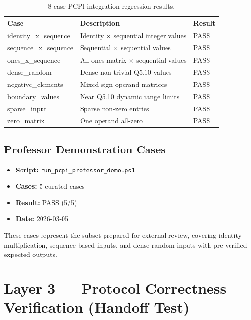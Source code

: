 ﻿\documentclass[12pt,a4paper]{report}
\renewcommand{\arraystretch}{1.2}
\begin{document}
\begin{table}[H]
\centering
\caption{8-case PCPI integration regression results.}
\label{tab:regression_tests}
\small
\setlength{\tabcolsep}{8pt}
\renewcommand{\arraystretch}{1.3}
\begin{tabular}{lll}
\toprule
\textbf{Case} & \textbf{Description} & \textbf{Result} \\
\midrule
identity\_x\_sequence      & Identity $\times$ sequential integer values & PASS \\
sequence\_x\_sequence      & Sequential $\times$ sequential values       & PASS \\
ones\_x\_sequence          & All-ones matrix $\times$ sequential values  & PASS \\
dense\_random              & Dense non-trivial Q5.10 values              & PASS \\
negative\_elements         & Mixed-sign operand matrices                 & PASS \\
boundary\_values           & Near Q5.10 dynamic range limits             & PASS \\
sparse\_input              & Sparse non-zero entries                     & PASS \\
zero\_matrix               & One operand all-zero                        & PASS \\
\bottomrule
\end{tabular}
\end{table}

\subsection{Professor Demonstration Cases}

\begin{itemize}
    \item \textbf{Script:} \texttt{run\_pcpi\_professor\_demo.ps1}
    \item \textbf{Cases:} 5 curated cases
    \item \textbf{Result:} PASS (5/5)
    \item \textbf{Date:} 2026-03-05
\end{itemize}

These cases represent the subset prepared for external review, covering identity multiplication, sequence-based inputs, and dense random inputs with pre-verified expected outputs.

\section{Layer 3 --- Protocol Correctness Verification (Handoff Test)}
\end{document}
